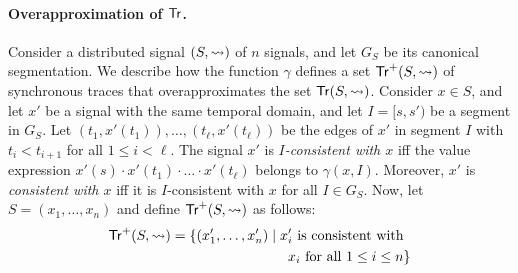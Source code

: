 \paragraph*{Overapproximation of $\mathsf{Tr}$.}
Consider a distributed signal $(S,{\rightsquigarrow})$ of $n$ signals, and let $G_S$ be its canonical segmentation.
We describe how the function $\gamma$ defines a set $\mathsf{Tr}^+(S,{\rightsquigarrow})$ of synchronous traces that overapproximates the set $\mathsf{Tr}(S,{\rightsquigarrow})$.
%
%
%
Consider $x \in S$, and let $x'$ be a signal with the same temporal domain, and let $I = [s, s')$ be a segment in $G_S$.
Let $(t_1, x'(t_1)), \ldots, (t_\ell, x'(t_\ell))$ be the edges of $x'$ in segment $I$ with $t_i < t_{i+1}$ for all $1 \leq i < \ell$.
The signal $x'$ is \emph{$I$-consistent with $x$} iff the value expression $x'(s) \cdot x'(t_1) \cdot \ldots \cdot x'(t_\ell)$ belongs to $\gamma(x,I)$.
Moreover, $x'$ is \emph{consistent with $x$} iff it is $I$-consistent with $x$ for all $I \in G_S$.
Now, let $S = (x_1, \ldots, x_n)$ and define $\mathsf{Tr}^+(S,{\rightsquigarrow})$ as follows:
\begin{align*}
	\tr^+(S,{\hb}) = \{ (x_1', \ldots, x_n') \st \text{$x_i'$ is consistent with}&\\
	\text{$x_i$ for all $1 \leq i \leq n$}&\} 
\end{align*}


